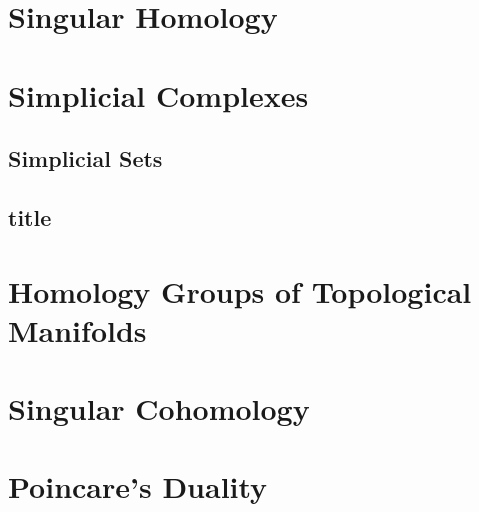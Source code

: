 \documentclass[Total.tex]{subfiles}
\begin{document}
	\chapter{Singular Homology}
	\chapter{Simplicial Complexes}
		\section{Simplicial Sets}
		\section{title}
	\chapter{Homology Groups of Topological Manifolds}
	\chapter{Singular Cohomology}
	\chapter{Poincare's Duality}
	
	
\end{document}
